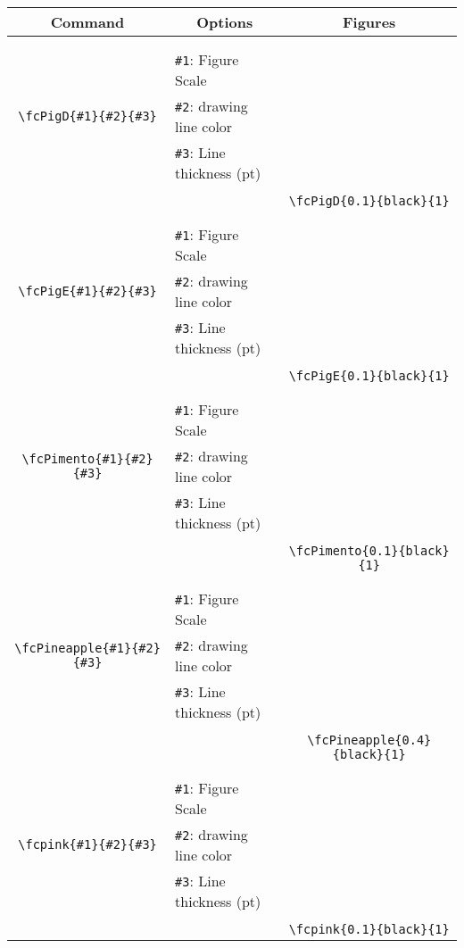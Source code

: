 \documentclass[x11names]{article}
\begin{document}
\begin{table}[H]\centering\begin{tabular}{|c|l|c|}\hline {\bf Command}& \multicolumn{1}{c|}{{\bf Options}} & {\bf Figures}\\  \hline	&&\multirow{5}{*}{\fcPigD{0.1}{black}{1}}\\	&&\\	&\verb|#1|: Figure Scale &\\	\verb|\fcPigD{#1}{#2}{#3}|&	\verb|#2|: drawing line color &\\	&\verb|#3|: Line thickness (pt) &\\ &&\\&&	\verb|\fcPigD{0.1}{black}{1}|\\\hline 	
	&&\multirow{5}{*}{\fcPigE{0.1}{black}{1}}\\	&&\\	&\verb|#1|: Figure Scale &\\	\verb|\fcPigE{#1}{#2}{#3}|&	\verb|#2|: drawing line color &\\	&\verb|#3|: Line thickness (pt) &\\ &&\\&&	\verb|\fcPigE{0.1}{black}{1}|\\\hline 	
	&&\multirow{5}{*}{\fcPimento{0.1}{black}{1}}\\	&&\\	&\verb|#1|: Figure Scale &\\	\verb|\fcPimento{#1}{#2}{#3}|&	\verb|#2|: drawing line color &\\	&\verb|#3|: Line thickness (pt) &\\ &&\\&&	\verb|\fcPimento{0.1}{black}{1}|\\\hline 	
	&&\multirow{5}{*}{\fcPineapple{0.4}{black}{1}}\\	&&\\	&\verb|#1|: Figure Scale &\\	\verb|\fcPineapple{#1}{#2}{#3}|&	\verb|#2|: drawing line color &\\	&\verb|#3|: Line thickness (pt) &\\ &&\\&&	\verb|\fcPineapple{0.4}{black}{1}|\\\hline 	
	&&\multirow{5}{*}{\fcpink{0.1}{black}{1}}\\	&&\\	&\verb|#1|: Figure Scale &\\	\verb|\fcpink{#1}{#2}{#3}|&	\verb|#2|: drawing line color &\\	&\verb|#3|: Line thickness (pt) &\\ &&\\&&	\verb|\fcpink{0.1}{black}{1}|\\\hline 	

\end{tabular}
\end{table}
\end{document}
